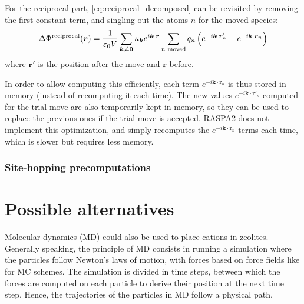 \documentclass[main.tex]{subfiles}
\begin{document}
For the reciprocal part, \cref{eq:reciprocal_decomposed} can be revisited by removing the first constant term, and singling out the atoms $n$ for the moved species:
\[\Delta\Phi^\text{reciprocal}(\boldsymbol{r}) = \frac1{\varepsilon_0V}\sum_{\boldsymbol{k}\not\kern0.2ex=\boldsymbol{0}} \kappa_{\boldsymbol k}e^{i\boldsymbol k\cdot\boldsymbol{r}} \sum_{n\text{ moved}}q_n\left(e^{-i\boldsymbol k\cdot\boldsymbol{r}'_n} - e^{-i\boldsymbol k\cdot\boldsymbol r_n}\right)\]
where $\boldsymbol{r}'$ is the position after the move and $\boldsymbol{r}$ before.

In order to allow computing this efficiently, each term $e^{-i\boldsymbol k\cdot\boldsymbol r_n}$ is thus stored in memory (instead of recomputing it each time). The new values $e^{-i\boldsymbol k\cdot\boldsymbol{r}'_n}$ computed for the trial move are also temporarily kept in memory, so they can be used to replace the previous ones if the trial move is accepted. RASPA2 does not implement this optimization, and simply recomputes the $e^{-i\boldsymbol k\cdot\boldsymbol r_n}$ terms each time, which is slower but requires less memory.


\subsubsection{Site-hopping precomputations}


\section{Possible alternatives}

\label{metadynamics}

Molecular dynamics (MD) could also be used to place cations in zeolites. Generally speaking, the principle of MD consists in running a simulation where the particles follow Newton's laws of motion, with forces based on force fields like for MC schemes. The simulation is divided in time steps, between which the forces are computed on each particle to derive their position at the next time step. Hence, the trajectories of the particles in MD follow a physical path.
\end{document}
